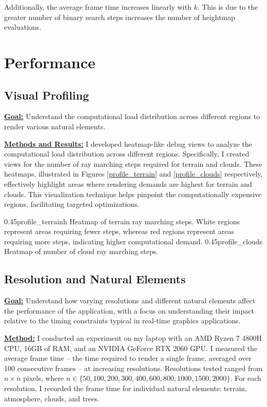 Additionally, the average frame time increases linearly with $k$. This is due to the greater number of binary search steps increases the number of heightmap evaluations.




\section{Performance}
\label{Performance}

\subsection{Visual Profiling}

\textbf{\underline{Goal:}}
Understand the computational load distribution across different regions to render various natural elements.

\textbf{\underline{Methods and Results:}}
I developed heatmap-like debug views to analyze the computational load distribution across different regions. Specifically, I created views for the number of ray marching steps required for terrain and clouds. These heatmaps, illustrated in Figures \ref{profile_terrain} and \ref{profile_clouds} respectively, effectively highlight areas where rendering demands are highest for terrain and clouds. This visualization technique helps pinpoint the computationally expensive regions, facilitating targeted optimizations.

\myfigurerow
{0.45}{profile_terrain}{h}
{Heatmap of terrain ray marching steps. White regions represent areas requiring fewer steps, whereas red regions represent areas requiring more steps, indicating higher computational demand.}
{0.45}{profile_clouds}
{Heatmap of number of cloud ray marching steps.}


\subsection{Resolution and Natural Elements}

\textbf{\underline{Goal:}} 
Understand how varying resolutions and different natural elements affect the performance of the application, with a focus on understanding their impact relative to the timing constraints typical in real-time graphics applications.

\textbf{\underline{Method:}}
I conducted an experiment on my laptop with an AMD Ryzen 7 4800H CPU, 16GB of RAM, and an NVIDIA GeForce RTX 2060 GPU. I measured the average frame time -- the time required to render a single frame, averaged over 100 consecutive frames -- at increasing resolutions. Resolutions tested ranged from $n \times n$ pixels, where $n \in \{50, 100, 200, 300, 400, 600, 800, 1000, 1500, 2000\}$. For each resolution, I recorded the frame time for individual natural elements: terrain, atmosphere, clouds, and trees.

